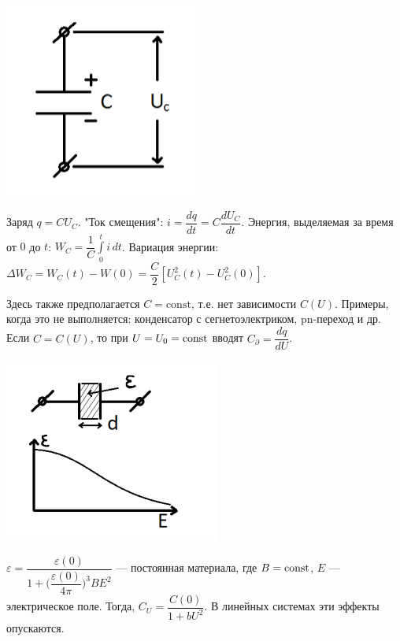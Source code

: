 \documentclass[../main/main.tex]{subfiles}
\begin{document}
\begin{enumerate}
\begin{minipage}{6cm}
\centering
\includegraphics[scale=0.7]{../section01/images/capacitor/capacitor.png} %
\end{minipage} \hfill   
\begin{minipage}{11cm}
    Заряд $q = CU_C$. "Ток смещения": $i = \dfrac{dq}{dt} = C \dfrac{dU_C}{dt}$. Энергия, выделяемая за время от $0$ до $t$: $W_C = \dfrac{1}{C} \displaystyle \int\limits_{0}^{t} i \, dt$. Вариация энергии: $\Delta W_C = W_C(t) - W(0) = \dfrac{C}{2} [U_C^2(t) - U_C^2(0)]$.
\end{minipage}


    
    Здесь также предполагается $C = \text{const}$, т.е. нет зависимости $C(U)$. Примеры, когда это не выполняется: конденсатор с сегнетоэлектриком, pn-переход и др. Если $C = C(U)$, то при $U = U_0 = \text{\text{const}}$ вводят $C_\partial = \dfrac{dq}{dU}$. 
    
\begin{minipage}{6cm}
\centering
\includegraphics[scale=0.7]{../section01/images/capacitor_plot/capacitor_plot.png} %
\end{minipage} \hfill   
\begin{minipage}{11cm}
    $\varepsilon = \dfrac{\varepsilon(0)}{1 + \bigg(\dfrac{\varepsilon(0)}{4\pi}\bigg)^3 BE^2}$ --- постоянная материала, где $B = \text{\text{const}}$, $E$ --- электрическое поле. Тогда, $C_U = \dfrac{C(0)}{1 + bU^2}$. В линейных системах эти эффекты опускаются. 
\end{minipage}
    

\end{enumerate}
\end{document}
